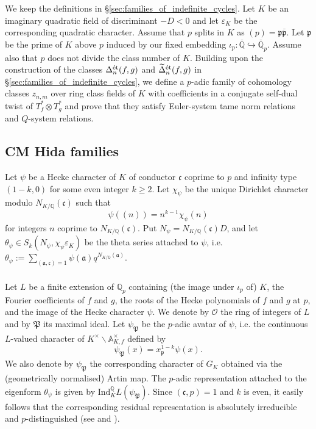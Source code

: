 \documentclass{amsart}
\numberwithin{equation}{section}
\newcommand{\bb}{\mathbb}
\newcommand{\frk}{\mathfrak}
\newcommand{\Ind}{\mathrm{Ind}}
\newcommand{\etale}{\textup{\'et}}
\begin{document}
We keep the definitions in \S\ref{sec:families_of_indefinite_cycles}. Let $K$ be an imaginary quadratic field of discriminant $-D<0$ and let $\varepsilon_{K}$ be the corresponding quadratic character. Assume that $p$ splits in $K$ as $(p)=\frk{p}\overline{\frk{p}}$. Let $\frk{p}$ be the prime of $K$ above $p$ induced by our fixed embedding $\iota_p:\overline{\bb{Q}}\hookrightarrow\overline{\bb{Q}}_p$. Assume also that $p$ does not divide the class number of $K$. Building upon the construction of the classes ${\Delta}_{n}^{\etale}(f,g)$ and $\widetilde{\Delta}_{n}^{\etale}(f,g)$ in \S\ref{sec:families_of_indefinite_cycles}, we define a $p$-adic family of cohomology classes $z_{n,m}$ over ring class fields of $K$ with coefficients in a conjugate self-dual twist of $T_f^\ast\otimes T_g^\ast$ and prove that they satisfy Euler-system tame norm relations and $Q$-system relations. 

\vspace{-0.2cm}
\subsection{CM Hida families}
\label{subsec_CM_Hida_fam}

Let $\psi$ be a Hecke character of $K$ of conductor $\frk{c}$ coprime to $p$ and infinity type $(1-k,0)$ for some even integer $k\geq 2$. Let $\chi_\psi$ be the unique Dirichlet character modulo $N_{K/\bb{Q}}(\frk{c})$ such that 
\[
\psi((n))=n^{k-1} \chi_\psi(n)
\]
for integers $n$ coprime to $N_{K/\bb{Q}}(\frk{c})$. Put $N_\psi=N_{K/\bb{Q}}(\frk{c})D$, and let $\theta_{\psi} \in S_k(N_{\psi}, \chi_\psi\varepsilon_{K})$ be the theta series attached to $\psi$, i.e. $\theta_{\psi} := \sum_{(\frk{a}, \frk{c})=1} \psi(\frk{a}) q^{N_{K/\bb{Q}}(\frk{a})}$.
\subsubsection{}
\label{subsubsec_2025_11_12_1049}
Let $L$ be a finite extension of $\bb{Q}_p$ containing (the image under $\iota_p$ of) $K$, the Fourier coefficients of $f$ and $g$, the roots of the Hecke polynomials of $f$ and $g$ at $p$, and the image of the Hecke character $\psi$. We denote by $\mathcal{O}$ the ring of integers of $L$ and by $\frk{P}$ its maximal ideal. Let $\psi_{\mathfrak{P}}$ be the $p$-adic avatar of $\psi$, i.e. the continuous $L$-valued character of $K^\times\backslash\mathbb{A}_{K,f}^\times$ defined by
\[
\psi_{\mathfrak{P}}(x)=x_\mathfrak{p}^{1-k} \psi(x).
\]
We also denote by $\psi_\mathfrak{P}$ the corresponding character of $G_K$ obtained via the (geometrically normalised) Artin map. The $p$-adic representation attached to the eigenform $\theta_\psi$ is given by $\Ind_{K}^\bb{Q} L(\psi_\frk{P})$. Since $(\frk{c},p)=1$ and $k$ is even, it easily follows that the corresponding residual representation is absolutely irreducible and $p$-distinguished (see \cite[Prop.~5.1.2]{LLZ2} and \cite[Remark~5.1.3]{LLZ2}).
\end{document}
